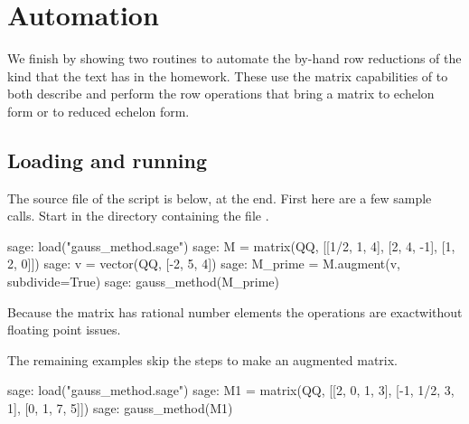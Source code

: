 \section{Automation}

We finish by showing two routines to automate the by-hand row reductions 
of the kind that the text has in the homework.
These use the matrix capabilities of \Sage{} to both describe 
and perform the row operations that bring a matrix to 
echelon form or to reduced echelon form. 

\subsection{Loading and running}
The source file of the script is below, at the end. 
First here are a few sample calls.
Start \Sage{} in the directory containing the file .
\begin{sagecommandline}
sage: load("gauss_method.sage")
sage: M = matrix(QQ, [[1/2, 1, 4], [2, 4, -1], [1, 2, 0]])          
sage: v = vector(QQ, [-2, 5, 4])
sage: M_prime = M.augment(v, subdivide=True)  
sage: gauss_method(M_prime)
\end{sagecommandline}

Because the matrix has rational number elements the operations are 
exact\Dash without floating point issues.

The remaining examples skip the steps to make an augmented matrix. 
\begin{sagecommandline}
sage: load("gauss_method.sage")
sage: M1 = matrix(QQ, [[2, 0, 1, 3], [-1, 1/2, 3, 1], [0, 1, 7, 5]])
sage: gauss_method(M1)
\end{sagecommandline}

